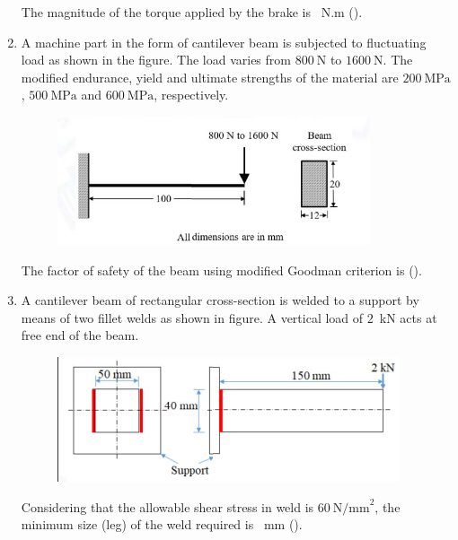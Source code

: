 \documentclass[journal]{IEEEtran}
\begin{document}
\begin{enumerate}
The magnitude of the torque applied by the brake is \underline{\hspace{2cm}}~N.m ().

\hfill{}

\item A machine part in the form of cantilever beam is subjected to fluctuating load as shown in the figure. The load varies from $800~\text{N}$ to $1600~\text{N}$. The modified endurance, yield and ultimate strengths of the material are $200~\text{MPa}$, $500~\text{MPa}$ and $600~\text{MPa}$, respectively.
\begin{figure}[h]
\centering
\includegraphics[width=0.5\columnwidth]{Figs/image (58).png}
\caption*{}
\label{fig:54}
\end{figure}
The factor of safety of the beam using modified Goodman criterion is \underline{\hspace{2cm}} ().

\hfill{}


\item A cantilever beam of rectangular cross-section is welded to a support by means of two fillet welds as shown in figure. A vertical load of $2$~kN acts at free end of the beam.
\begin{figure}[h]
\centering
\includegraphics[width=0.5\columnwidth]{Figs/image (59).png}
\caption*{}
\label{fig:55}
\end{figure}
Considering that the allowable shear stress in weld is $60~\text{N/mm}^2$, the minimum size (leg) of the weld required is \underline{\hspace{2cm}}~mm ().

\hfill{}

\end{enumerate}
\end{document}
